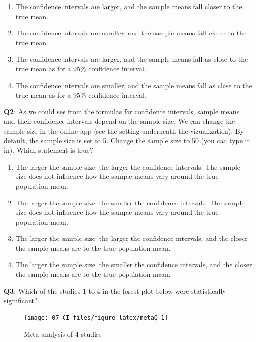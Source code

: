 \documentclass[
]{krantz}
\providecommand{\tightlist}{%
  \setlength{\itemsep}{0pt}\setlength{\parskip}{0pt}}
\begin{document}
\begin{enumerate}
\def\labelenumi{\Alph{enumi})}
\tightlist
\item
  The confidence intervals are larger, and the sample means fall closer to the true mean.
\item
  The confidence intervals are smaller, and the sample means fall closer to the true mean.
\item
  The confidence intervals are larger, and the sample means fall as close to the true mean as for a 95\% confidence interval.
\item
  The confidence intervals are smaller, and the sample means fall as close to the true mean as for a 95\% confidence interval.
\end{enumerate}

\textbf{Q2}: As we could see from the formulas for confidence intervals, sample means and their confidence intervals depend on the sample size. We can change the sample size in the online app (see the setting underneath the vizualization). By default, the sample size is set to 5. Change the sample size to 50 (you can type it in). Which statement is true?

\begin{enumerate}
\def\labelenumi{\Alph{enumi})}
\tightlist
\item
  The larger the sample size, the larger the confidence intervals. The sample size does not influence how the sample means vary around the true population mean.
\item
  The larger the sample size, the smaller the confidence intervals. The sample size does not influence how the sample means vary around the true population mean.
\item
  The larger the sample size, the larger the confidence intervals, and the closer the sample means are to the true population mean.
\item
  The larger the sample size, the smaller the confidence intervals, and the closer the sample means are to the true population mean.
\end{enumerate}

\textbf{Q3}: Which of the studies 1 to 4 in the forest plot below were statistically significant?

\begin{figure}

{\centering \texttt{[image: 07-CI\_files/figure-latex/metaQ-1]} 

}

\caption{Meta-analysis of 4 studies}\label{fig:metaQ}
\end{figure}
\end{document}
